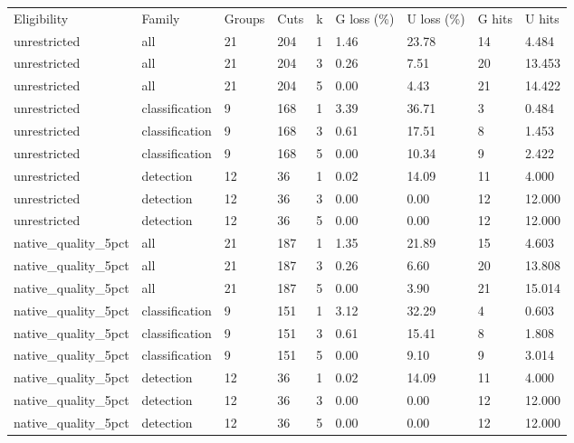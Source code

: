 \begin{tabular}{lllllllll}
Eligibility & Family & Groups & Cuts & k & G loss (\%) & U loss (\%) & G hits & U hits \\
unrestricted & all & 21 & 204 & 1 & 1.46 & 23.78 & 14 & 4.484 \\
unrestricted & all & 21 & 204 & 3 & 0.26 & 7.51 & 20 & 13.453 \\
unrestricted & all & 21 & 204 & 5 & 0.00 & 4.43 & 21 & 14.422 \\
unrestricted & classification & 9 & 168 & 1 & 3.39 & 36.71 & 3 & 0.484 \\
unrestricted & classification & 9 & 168 & 3 & 0.61 & 17.51 & 8 & 1.453 \\
unrestricted & classification & 9 & 168 & 5 & 0.00 & 10.34 & 9 & 2.422 \\
unrestricted & detection & 12 & 36 & 1 & 0.02 & 14.09 & 11 & 4.000 \\
unrestricted & detection & 12 & 36 & 3 & 0.00 & 0.00 & 12 & 12.000 \\
unrestricted & detection & 12 & 36 & 5 & 0.00 & 0.00 & 12 & 12.000 \\
native\_quality\_5pct & all & 21 & 187 & 1 & 1.35 & 21.89 & 15 & 4.603 \\
native\_quality\_5pct & all & 21 & 187 & 3 & 0.26 & 6.60 & 20 & 13.808 \\
native\_quality\_5pct & all & 21 & 187 & 5 & 0.00 & 3.90 & 21 & 15.014 \\
native\_quality\_5pct & classification & 9 & 151 & 1 & 3.12 & 32.29 & 4 & 0.603 \\
native\_quality\_5pct & classification & 9 & 151 & 3 & 0.61 & 15.41 & 8 & 1.808 \\
native\_quality\_5pct & classification & 9 & 151 & 5 & 0.00 & 9.10 & 9 & 3.014 \\
native\_quality\_5pct & detection & 12 & 36 & 1 & 0.02 & 14.09 & 11 & 4.000 \\
native\_quality\_5pct & detection & 12 & 36 & 3 & 0.00 & 0.00 & 12 & 12.000 \\
native\_quality\_5pct & detection & 12 & 36 & 5 & 0.00 & 0.00 & 12 & 12.000 \\
\end{tabular}
